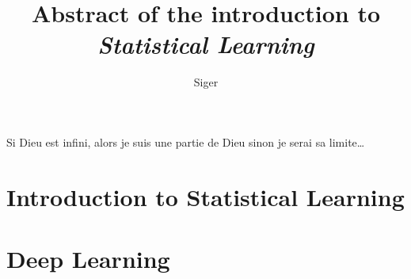 \documentclass[a4paper, 10pt]{book}  %
\title{Abstract of the introduction to \emph{Statistical Learning}}
\author{Siger}
\begin{document}
\maketitle

Si Dieu est infini, alors je suis une partie de Dieu sinon je serai sa limite\ldots

\tableofcontents

\chapter{Introduction to Statistical Learning}

\chapter{Deep Learning}

\end{document}
